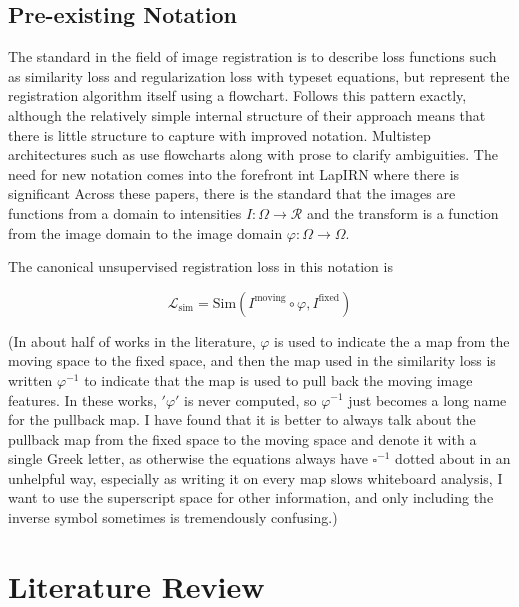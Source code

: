 \documentclass{article}
\begin{document}
\subsection{Pre-existing Notation}
The standard in the field of image registration is to describe loss functions
such as similarity loss and regularization loss with typeset equations, but
represent the registration algorithm itself using a flowchart.
\cite{balakrishnan2019voxelmorph} Follows this pattern exactly, although the
relatively simple internal structure of their approach means that there is
little structure to capture with improved notation. Multistep architectures
such as \cite{shen2019networks, mok2020large} use flowcharts along with prose
to clarify ambiguities. The need for new notation comes into the forefront int
LapIRN \cite{mok2020large} where there is significant Across these papers,
there is the standard that the images are functions from a domain to
intensities $I: \Omega \rightarrow \mathcal{R}$ and the transform is a function
from the image domain to the image domain $\varphi: \Omega \rightarrow \Omega$.

The canonical unsupervised registration loss in this notation is

$$\mathcal{L}_\text{sim} = \text{Sim}(I^\text{moving} \circ  \varphi , I^\text{fixed}) $$

(In about half of works in the literature, $\varphi$ is used to indicate the a map from the moving space to the fixed space, and then the map used in the similarity loss is written $\varphi^{-1}$ to indicate that the map is used to pull back the moving image features. In these works, $'\varphi'$ is never computed, so $\varphi^{-1}$ just becomes a long name for the pullback map. I have found that it is better to always talk about the pullback map from the fixed space to the moving space and denote it with a single Greek letter, as otherwise the equations always have $\square^{-1}$ dotted about in an unhelpful way, especially as writing it on every map slows whiteboard analysis, I want to use the superscript space for other information, and only including the inverse symbol sometimes is tremendously confusing.)

\section{Literature Review}
\end{document}
